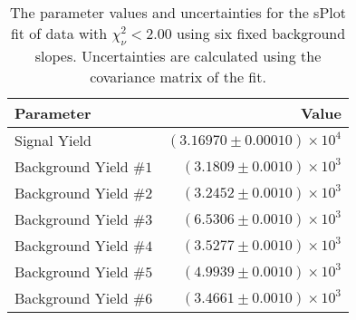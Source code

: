 
\begin{table}[ht]
    \begin{center}
        \begin{tabular}{lr}\toprule
            Parameter & Value \\\midrule
            Signal Yield & $(3.16970 \pm 0.00010) \times 10^{4}$ \\
            Background Yield $\#1$ & $(3.1809 \pm 0.0010) \times 10^{3}$ \\
            Background Yield $\#2$ & $(3.2452 \pm 0.0010) \times 10^{3}$ \\
            Background Yield $\#3$ & $(6.5306 \pm 0.0010) \times 10^{3}$ \\
            Background Yield $\#4$ & $(3.5277 \pm 0.0010) \times 10^{3}$ \\
            Background Yield $\#5$ & $(4.9939 \pm 0.0010) \times 10^{3}$ \\
            Background Yield $\#6$ & $(3.4661 \pm 0.0010) \times 10^{3}$ \\\bottomrule
        \end{tabular}
        \caption{The parameter values and uncertainties for the sPlot fit of data with $\chi^2_\nu < 2.00$ using six fixed background slopes. Uncertainties are calculated using the covariance matrix of the fit.}\label{tab:splot-fit-results-chisqdof-2.00-fixed-6}
    \end{center}
\end{table}
